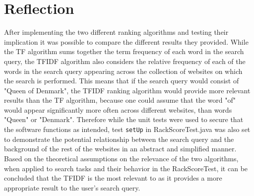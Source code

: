 \section{Reflection}
After implementing the two different ranking algorithms and testing their implication it was possible to compare the different results they provided.
While the TF algorithm sums together the term frequency of each word in the search query, the TFIDF algorithm also considers the relative frequency of each of the words in the search query appearing across the collection of websites on which the search is performed. This means that if the search query would consist of "Queen of Denmark", the TFIDF ranking algorithm would provide more relevant results than the TF algorithm, because one could assume that the word "of" would appear significantly more often across different websites, than words "Queen" or "Denmark". Therefore while the  unit tests were used to secure that the software functions as intended, test {\tt setUp} in RackScoreTest.java was also set to demonstrate the potential relationship between the search query and the background of the rest of the websites in an abstract and simplified manner.\\
Based on the theoretical assumptions on the relevance of the two algorithms, when applied to search tasks and their behavior in the RackScoreTest, it can be concluded that the TFIDF is the most relevant to as it provides a more appropriate result to the user's search query.